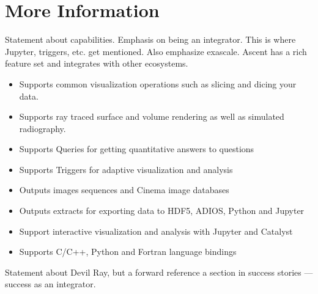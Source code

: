 \documentclass[graybox]{svmult}
\newcommand{\fix}[1]{\textcolor{red}{#1}} %
\begin{document}
\section{More Information}
\label{sec:information}



Statement about capabilities.  Emphasis on being an integrator.
This is where Jupyter, triggers, etc. get mentioned.  Also emphasize
exascale.
Ascent has a rich feature set and integrates with other ecosystems.

\begin{itemize}
  \item Supports common visualization operations such as slicing and dicing your data.
  \item Supports ray traced surface and volume rendering as well as simulated radiography.
  \item Supports Queries for getting quantitative answers to questions
  \item Supports Triggers for adaptive visualization and analysis
  \item Outputs images sequences and Cinema image databases
  \item Outputs extracts for exporting data to HDF5, ADIOS, Python and Jupyter
  \item Support interactive visualization and analysis with Jupyter and Catalyst
  \item Supports C/C++, Python and Fortran language bindings
\end{itemize}

Statement about Devil Ray, but a forward reference a section in success stories --- success as an integrator.
\fi




%


%

%




\end{document}
